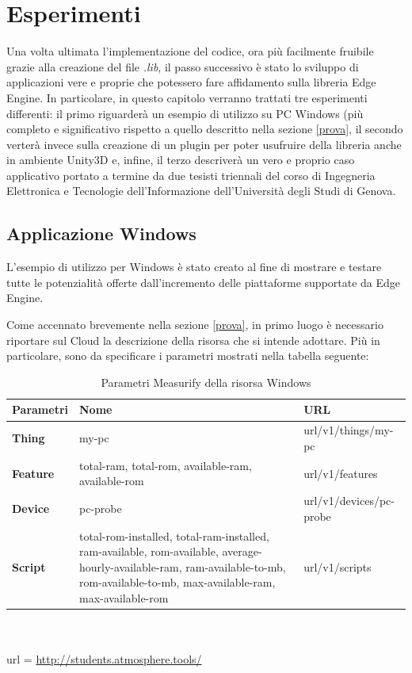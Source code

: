 \chapter{Esperimenti}
Una volta ultimata l’implementazione del codice, ora più facilmente fruibile grazie alla creazione del file \textit{.lib}, il passo successivo è stato lo sviluppo di applicazioni vere e proprie che potessero fare affidamento sulla libreria Edge Engine. In particolare, in questo capitolo verranno trattati tre esperimenti differenti: il primo riguarderà un esempio di utilizzo su PC Windows (più completo e significativo rispetto a quello descritto nella sezione \ref{prova}, il secondo verterà invece sulla creazione di un plugin per poter usufruire della libreria anche in ambiente Unity3D e, infine, il terzo descriverà un vero e proprio caso applicativo portato a termine da due tesisti triennali del corso di Ingegneria Elettronica e Tecnologie dell'Informazione dell'Università degli Studi di Genova.
\section{Applicazione Windows}
L'esempio di utilizzo per Windows è stato creato al fine di mostrare e testare tutte le potenzialità offerte dall'incremento delle piattaforme supportate da Edge Engine.

Come accennato brevemente nella sezione \ref{prova}, in primo luogo è necessario riportare sul Cloud la descrizione della risorsa che si intende adottare. Più in particolare, sono da specificare i parametri mostrati nella tabella seguente:

\begin{table}[H]
	\begin{tabular}{|p{}|p{}|p{}|}
		\hline
		\textbf{Parametri} & \textbf{Nome} & \textbf{URL}\\
		\hline
		\textbf{Thing} & my-pc & {{url}}/v1/things/my-pc\\
		\hline
		\textbf{Feature} & total-ram, total-rom, available-ram, available-rom & {{url}}/v1/features\\
		\hline
		\textbf{Device} & pc-probe & {{url}}/v1/devices/pc-probe\\	
		\hline
		\textbf{Script} & total-rom-installed, total-ram-installed, ram-available, rom-available, average-hourly-available-ram, ram-available-to-mb, rom-available-to-mb,  max-available-ram, max-available-rom & {{url}}/v1/scripts\\	
		\hline
	\end{tabular}
\\\\url = \url{http://students.atmosphere.tools/}
	\caption{Parametri Measurify della risorsa Windows}
	\label{paramMeas}
\end{table}

